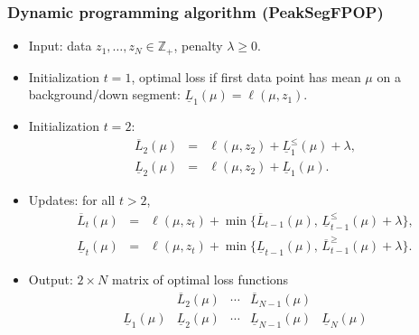\documentclass{beamer}
\newcommand{\ZZ}{\mathbb Z}
\begin{document}
\begin{frame}
  \frametitle{Dynamic programming algorithm (PeakSegFPOP)}
  \begin{itemize}
    \item Input: data $z_1, \dots, z_N\in\ZZ_+$, penalty $\lambda \geq 0$.
    \item Initialization $t=1$, optimal loss if first data point has
      mean $\mu$ on a background/down segment:
      $\underline L_1(\mu) = \ell(\mu, z_1)$.
    \item Initialization $t=2$: 
      \begin{eqnarray*}
  \overline L_2(\mu) &=& \ell(\mu, z_2) + \underline L_1^\leq(\mu) + \lambda,\\
  \underline L_2(\mu) &=& \ell(\mu, z_2) + \underline L_1(\mu).
      \end{eqnarray*}
    \item Updates: for all $t>2$, 
      \begin{eqnarray*}
  \overline L_t(\mu) &=& \ell(\mu, z_t) + \min\{ \overline L_{t-1}(\mu),\, \underline L_{t-1}^\leq(\mu) + \lambda \},\\
  \underline L_t(\mu) &=& \ell(\mu, z_t) + \min\{ \underline L_{t-1}(\mu),\, \overline L_{t-1}^\geq(\mu) + \lambda \}.
      \end{eqnarray*}
\item Output: $2 \times N$ matrix of optimal loss functions
$$
\begin{array}{ccccc}
   & \overline L_{2}(\mu) & \cdots & \overline L_{N-1}(\mu) & \\
  \underline L_{1}(\mu) &\underline L_{2}(\mu) & \cdots & \underline L_{N-1}(\mu)& \underline L_{N}(\mu)\\
\end{array}
$$
  \end{itemize}
\end{frame}
\end{document}
